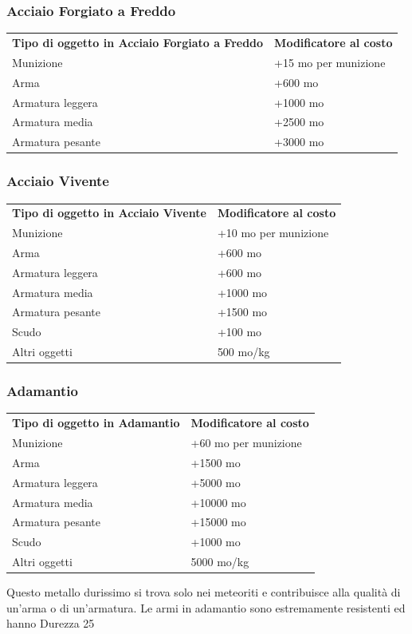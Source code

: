 \documentclass[a4paper,11pt,twoside,openany]{book}
\begin{document}
{\subsubsection{Acciaio Forgiato a Freddo}

\label{acciaio-forgiato-a-freddo}

\begin{tabular}{ll}
\toprule
\textbf{Tipo di oggetto in Acciaio Forgiato a Freddo} & \textbf{Modificatore al costo}\tabularnewline
Munizione & +15 mo per munizione\tabularnewline
Arma & +600 mo\tabularnewline
Armatura leggera & +1000 mo\tabularnewline
Armatura media & +2500 mo\tabularnewline
Armatura pesante & +3000 mo\tabularnewline
\end{tabular}

\subsubsection{Acciaio Vivente}

\label{acciaio-vivente}

\begin{tabular}{ll}
\toprule 
\textbf{Tipo di oggetto in Acciaio Vivente} & \textbf{Modificatore al costo}\tabularnewline
Munizione & +10 mo per munizione\tabularnewline
Arma & +600 mo\tabularnewline
Armatura leggera & +600 mo\tabularnewline
Armatura media & +1000 mo\tabularnewline
Armatura pesante & +1500 mo\tabularnewline
Scudo & +100 mo\tabularnewline
Altri oggetti & 500 mo/kg\tabularnewline
\end{tabular}

\subsubsection{Adamantio}

\label{adamantio}

\begin{tabular}{ll}
\toprule 
\textbf{Tipo di oggetto in Adamantio} & \textbf{Modificatore al costo}\tabularnewline
Munizione & +60 mo per munizione\tabularnewline
Arma & +1500 mo\tabularnewline
Armatura leggera & +5000 mo\tabularnewline
Armatura media & +10000 mo\tabularnewline
Armatura pesante & +15000 mo\tabularnewline
Scudo & +1000 mo\tabularnewline
Altri oggetti & 5000 mo/kg\tabularnewline
\end{tabular}

Questo metallo durissimo si trova solo nei meteoriti e contribuisce alla qualità di un'arma o di un'armatura. Le armi in adamantio sono estremamente resistenti ed hanno Durezza 25

}
\end{document}
